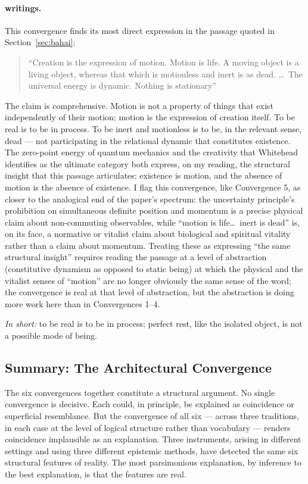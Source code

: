 \paragraph{\bahai writings.}
This convergence finds its most direct expression in the passage quoted
in Section~\ref{sec:bahai}:
\begin{quote}
``Creation is the expression of motion. Motion is life. A moving object
is a living object, whereas that which is motionless and inert is as dead. \ldots\ The universal energy is dynamic.
Nothing is stationary''
\citep[Talk 52]{PUP}
\end{quote}
The claim is comprehensive.
Motion is not a property of things that exist independently of their
motion; motion is the expression of creation itself.
To be real is to be in process.
To be inert and motionless is to be, in the relevant sense, dead ---
not participating in the relational dynamic that constitutes existence.
The zero-point energy of quantum mechanics and the creativity that Whitehead identifies as the ultimate category both express, on my reading, the structural insight that this passage articulates: existence is motion,
and the absence of motion is the absence of existence.
I flag this convergence, like Convergence 5, as closer to the analogical
end of the paper's spectrum: the uncertainty principle's prohibition on
simultaneous definite position and momentum is a precise physical claim
about non-commuting observables, while ``motion is life\ldots\ inert is
dead'' is, on its face, a normative or vitalist claim about biological
and spiritual vitality rather than a claim about momentum.
Treating these as expressing ``the same structural insight'' requires
reading the \bahai passage at a level of abstraction (constitutive
dynamism as opposed to static being) at which the physical and the
vitalist senses of ``motion'' are no longer obviously the same sense of
the word; the convergence is real at that level of abstraction, but the
abstraction is doing more work here than in Convergences 1--4.

\emph{In short:} to be real is to be in process; perfect rest, like the
isolated object, is not a possible mode of being.

\subsection{Summary: The Architectural Convergence}

The six convergences together constitute a structural argument.
No single convergence is decisive.
Each could, in principle, be explained as coincidence or superficial
resemblance.
But the convergence of all six --- across three traditions, in each
case at the level of logical structure rather than vocabulary ---
renders coincidence implausible as an explanation.
Three instruments, arising in different settings and using three different
epistemic methods, have detected the same six structural features of
reality.
The most parsimonious explanation, by inference to the best explanation,
is that the features are real.
